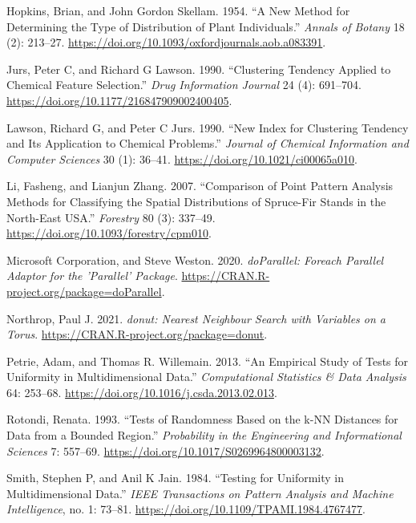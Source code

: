 \begin{CSLReferences}{1}{0}
\leavevmode{}%
Hopkins, Brian, and John Gordon Skellam. 1954. {``A New Method for Determining the Type of Distribution of Plant Individuals.''} \emph{Annals of Botany} 18 (2): 213--27. \url{https://doi.org/10.1093/oxfordjournals.aob.a083391}.

\leavevmode{}%
Jurs, Peter C, and Richard G Lawson. 1990. {``Clustering Tendency Applied to Chemical Feature Selection.''} \emph{Drug Information Journal} 24 (4): 691--704. \url{https://doi.org/10.1177/216847909002400405}.

\leavevmode{}%
Lawson, Richard G, and Peter C Jurs. 1990. {``New Index for Clustering Tendency and Its Application to Chemical Problems.''} \emph{Journal of Chemical Information and Computer Sciences} 30 (1): 36--41. \url{https://doi.org/10.1021/ci00065a010}.

\leavevmode{}%
Li, Fasheng, and Lianjun Zhang. 2007. {``Comparison of Point Pattern Analysis Methods for Classifying the Spatial Distributions of Spruce-Fir Stands in the North-East {USA}.''} \emph{Forestry} 80 (3): 337--49. \url{https://doi.org/10.1093/forestry/cpm010}.

\leavevmode{}%
Microsoft Corporation, and Steve Weston. 2020. \emph{{doParallel}: Foreach Parallel Adaptor for the 'Parallel' Package}. \url{https://CRAN.R-project.org/package=doParallel}.

\leavevmode{}%
Northrop, Paul J. 2021. \emph{{donut}: Nearest Neighbour Search with Variables on a Torus}. \url{https://CRAN.R-project.org/package=donut}.

\leavevmode{}%
Petrie, Adam, and Thomas R. Willemain. 2013. {``An Empirical Study of Tests for Uniformity in Multidimensional Data.''} \emph{Computational Statistics \& Data Analysis} 64: 253--68. \url{https://doi.org/10.1016/j.csda.2013.02.013}.

\leavevmode{}%
Rotondi, Renata. 1993. {``Tests of Randomness Based on the {k-NN} Distances for Data from a Bounded Region.''} \emph{Probability in the Engineering and Informational Sciences} 7: 557--69. \url{https://doi.org/10.1017/S0269964800003132}.

\leavevmode{}%
Smith, Stephen P, and Anil K Jain. 1984. {``Testing for Uniformity in Multidimensional Data.''} \emph{{IEEE} Transactions on Pattern Analysis and Machine Intelligence}, no. 1: 73--81. \url{https://doi.org/10.1109/TPAMI.1984.4767477}.


\end{CSLReferences}
